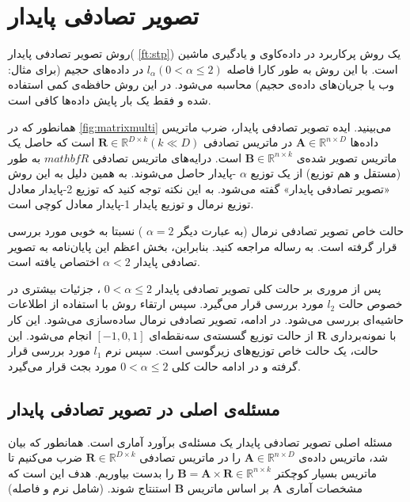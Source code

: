 \chapter{
تصویر تصادفی پایدار
}

روش تصویر تصادفی پایدار(%
\autoref{ft:stp})
\cite{litez116, litez166, litez19, litez99, litez96, litez104}
یک روش پرکاربرد در داده‌کاوی و یادگیری ماشین است. با این روش به طور کارا فاصله
$l_\alpha (0 < \alpha \leq 2)$
در داده‌های حجیم (برای مثال: وب یا جریان‌های داده‌ی حجیم) محاسبه می‌شود. در این روش حافظه‌ی کمی استفاده شده و فقط یک بار پایش داده‌ها کافی است. 

همانطور که در 
\autoref{fig:matrixmulti}
می‌بینید. ایده تصویر تصادفی پایدار، ضرب ماتریس داده‌ها
$\mathbf{A} \in \mathbb{R}^{n \times D}$
در ماتریس تصادفی 
$\mathbf{R} \in \mathbb{R}^{D \times k}  (k \ll D)$
است که حاصل یک ماتریس تصویر شده‌ی 
$\mathbf{B} \in \mathbb{R}^{n \times k}$
است. درایه‌های ماتریس تصادفی 
$mathbf{R}$
به طور 
(مستقل و هم توزیع)
از یک توزیع 
$\alpha$
-پایدار %
حاصل می‌شوند. به همین دلیل به این روش «تصویر تصادفی پایدار» گفته می‌شود. به این نکته توجه کنید که توزیع 2-پایدار معادل توزیع نرمال و توزیع پایدار 1-پایدار معادل کوچی%
است.

حالت خاص تصویر تصادفی نرمال (به عبارت دیگر
$\alpha = 2$
) نسبتا به خوبی مورد بررسی قرار گرفته است. به رساله
\cite{litez166}
مراجعه کنید. بنابراین، بخش اعظم این پایان‌نامه به تصویر تصادفی پایدار 
$\alpha < 2$
اختصاص یافته است.


پس از مروری بر حالت کلی تصویر تصادفی پایدار 
$0 < \alpha \leq 2$
، جزئیات بیشتری در خصوص حالت 
$l_2$
مورد بررسی قرار می‌گیرد. سپس ارتقاء روش با استفاده از اطلاعات حاشیه‌ای%
بررسی می‌شود. در ادامه، تصویر تصادفی نرمال ساده‌سازی می‌شود. این کار با نمونه‌برداری 
$\mathbf{R}$
از حالت توزیع گسسته‌ی سه‌نقطه‌ای 
$[ -1, 0, 1]$
انجام می‌شود. این حالت، یک حالت خاص توزیع‌های زیرگوسی%
است. سپس نرم 
$l_1$%
مورد بررسی قرار گرفته و در ادامه حالت کلی 
$0 < \alpha \leq 2$
مورد بجث قرار می‌گیرد.

\section{
مسئله‌ی اصلی در تصویر تصادفی پایدار
}
مسئله اصلی تصویر تصادفی پایدار یک مسئله‌ی برآورد آماری است. همانطور که بیان شد، ماتریس داده‌ی 
$\mathbf{A} \in \mathbb{R}^{n \times D}$
را در ماتریس تصادفی 
$\mathbf{R} \in \mathbb{R}^{D \times k}$
ضرب می‌کنیم تا ماتریس بسیار کوچکتر 
$\mathbf{B} = \mathbf{A} \times \mathbf{R} \in \mathbb{R}^{n \times k}$
را بدست بیاوریم. هدف این است که مشخصات آماری 
$\mathbf{A}$
بر اساس ماتریس 
$\mathbf{B}$
استنتاج شوند. (شامل نرم و فاصله)

